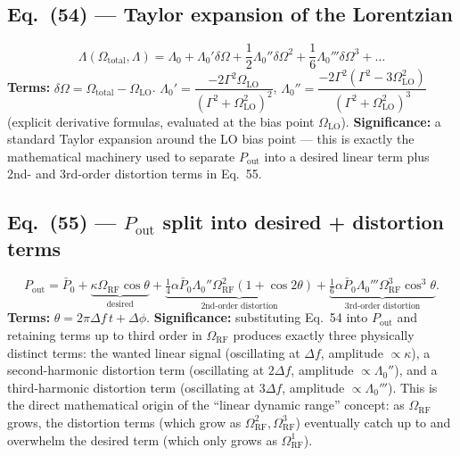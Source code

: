 \documentclass[11pt]{article}
\begin{document}
\subsection*{Eq.~(54) --- Taylor expansion of the Lorentzian}
\begin{equation}
\Lambda(\Omega_\text{total},\Lambda) = \Lambda_0+\Lambda_0'\delta\Omega+\frac12\Lambda_0''\delta\Omega^2+\frac16\Lambda_0'''\delta\Omega^3+\dots \tag{54}
\end{equation}
\textbf{Terms:} $\delta\Omega=\Omega_\text{total}-\Omega_\text{LO}$.
$\Lambda_0'=\dfrac{-2\Gamma^2\Omega_\text{LO}}{(\Gamma^2+\Omega_\text{LO}^2)^2}$,
$\Lambda_0''=\dfrac{-2\Gamma^2(\Gamma^2-3\Omega_\text{LO}^2)}{(\Gamma^2+\Omega_\text{LO}^2)^3}$
(explicit derivative formulas, evaluated at the bias point
$\Omega_\text{LO}$).
\textbf{Significance:} a standard Taylor expansion around the LO bias
point --- this is exactly the mathematical machinery used to separate
$P_\text{out}$ into a desired linear term plus 2nd- and 3rd-order
distortion terms in Eq.~55.

\subsection*{Eq.~(55) --- $P_\text{out}$ split into desired + distortion terms}
\begin{equation}
P_\text{out} =\bar P_0 + \underbrace{\kappa\Omega_\text{RF}\cos\theta}_{\text{desired}}
+ \underbrace{\tfrac14\alpha\bar P_0\Lambda_0''\Omega_\text{RF}^2(1+\cos2\theta)}_{\text{2nd-order distortion}}
+ \underbrace{\tfrac16\alpha\bar P_0\Lambda_0'''\Omega_\text{RF}^3\cos^3\theta}_{\text{3rd-order distortion}}. \tag{55}
\end{equation}
\textbf{Terms:} $\theta=2\pi\Delta f\,t+\Delta\phi$.
\textbf{Significance:} substituting Eq.~54 into $P_\text{out}$ and
retaining terms up to third order in $\Omega_\text{RF}$ produces exactly
three physically distinct terms: the wanted linear signal (oscillating
at $\Delta f$, amplitude $\propto\kappa$), a second-harmonic distortion
term (oscillating at $2\Delta f$, amplitude $\propto\Lambda_0''$), and a
third-harmonic distortion term (oscillating at $3\Delta f$, amplitude
$\propto\Lambda_0'''$). This is the direct mathematical origin of the
``linear dynamic range'' concept: as $\Omega_\text{RF}$ grows, the
distortion terms (which grow as $\Omega_\text{RF}^2,\Omega_\text{RF}^3$)
eventually catch up to and overwhelm the desired term (which only grows
as $\Omega_\text{RF}^1$).
\end{document}
